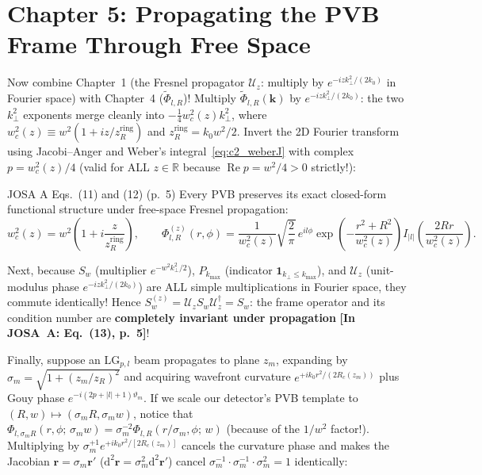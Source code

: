 \documentclass[10pt,letterpaper]{article}
\newcommand{\abs}[1]{\lvert #1 \rvert}
\newcommand{\dd}{\mathrm{d}}
\newcommand{\inpaper}[1]{\textcolor{crimsonborder}{\textbf{[In JOSA~A: #1]}}}
\numberwithin{equation}{section}
\begin{document}
\section{Chapter 5: Propagating the PVB Frame Through Free Space}
\label{sec:c5}

Now combine Chapter~1 (the Fresnel propagator $\mathcal{U}_z$: multiply by $e^{-iz k_\perp^2/(2k_0)}$ in Fourier space) with Chapter~4 ($\widetilde{\Phi}_{l,R}$)!
Multiply $\widetilde{\Phi}_{l,R}(\mathbf{k})$ by $e^{-iz k_\perp^2/(2k_0)}$: the two $k_\perp^2$ exponents merge cleanly into $-\frac{1}{4}w_c^2(z)k_\perp^2$, where $w_c^2(z) \equiv w^2(1 + iz/z_R^{\mathrm{ring}})$ and $z_R^{\mathrm{ring}} = k_0 w^2/2$. Invert the 2D Fourier transform using Jacobi--Anger and Weber's integral~\eqref{eq:c2_weberJ} with complex $p = w_c^2(z)/4$ (valid for ALL $z \in \mathbb{R}$ because $\operatorname{Re} p = w^2/4 > 0$ strictly!):

\begin{paperhit}{JOSA A Eqs.~(11) and (12) (p.~5)}
Every PVB preserves its exact closed-form functional structure under free-space Fresnel propagation:
\[
  w_c^2(z) = w^2\!\left(1 + i\frac{z}{z_R^{\mathrm{ring}}}\right), \qquad
  \Phi_{l,R}^{(z)}(r,\phi) = \frac{1}{w_c^2(z)}\sqrt{\frac{2}{\pi}}\,e^{il\phi}\exp\!\left(-\frac{r^2+R^2}{w_c^2(z)}\right) I_{\abs{l}}\!\left(\frac{2Rr}{w_c^2(z)}\right).
\]
\end{paperhit}

Next, because $S_w$ (multiplier $e^{-w^2 k_\perp^2/2}$), $P_{k_{\max}}$ (indicator $\mathbf{1}_{k_\perp \le k_{\max}}$), and $\mathcal{U}_z$ (unit-modulus phase $e^{-iz k_\perp^2/(2k_0)}$) are ALL simple multiplications in Fourier space, they commute identically! Hence $S_w^{(z)} = \mathcal{U}_z S_w \mathcal{U}_z^\dagger = S_w$: the frame operator and its condition number are \textbf{completely invariant under propagation} \inpaper{Eq.~(13), p.~5}!

Finally, suppose an $\mathrm{LG}_{p,l}$ beam propagates to plane $z_m$, expanding by $\sigma_m = \sqrt{1+(z_m/z_R)^2}$ and acquiring wavefront curvature $e^{+ik_0 r^2/(2R_c(z_m))}$ plus Gouy phase $e^{-i(2p+\abs{l}+1)\vartheta_m}$. If we scale our detector's PVB template to $(R,w) \mapsto (\sigma_m R, \sigma_m w)$, notice that $\Phi_{l,\sigma_m R}(r,\phi;\,\sigma_m w) = \sigma_m^{-2}\Phi_{l,R}(r/\sigma_m,\phi;\,w)$ (because of the $1/w^2$ factor!). Multiplying by $\sigma_m^{+1} e^{+ik_0 r^2/[2R_c(z_m)]}$ cancels the curvature phase and makes the Jacobian $\mathbf{r} = \sigma_m\mathbf{r}'$ ($\dd^2\mathbf{r} = \sigma_m^2\dd^2\mathbf{r}'$) cancel $\sigma_m^{-1}\cdot\sigma_m^{-1}\cdot\sigma_m^2 = 1$ identically:
\end{document}
